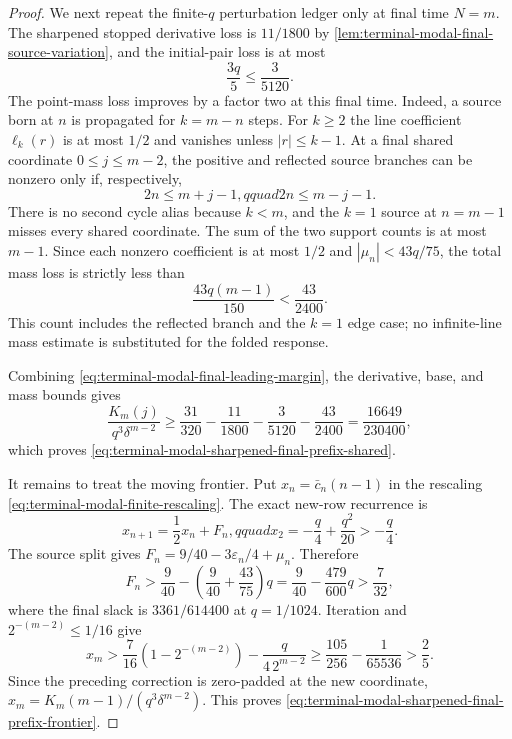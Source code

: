 \begin{proof}
We next repeat the finite-$q$ perturbation ledger only at final time $N=m$.
The sharpened stopped derivative loss is $11/1800$ by
\cref{lem:terminal-modal-final-source-variation}, and the initial-pair loss
is at most
\begin{equation}
 \frac{3q}{5}\le\frac3{5120}.
\end{equation}
The point-mass loss improves by a factor two at this final time.  Indeed, a
source born at $n$ is propagated for $k=m-n$ steps.  For $k\ge2$ the line
coefficient $\ell_k(r)$ is at most $1/2$ and vanishes unless
$|r|\le k-1$.  At a final shared coordinate $0\le j\le m-2$, the positive
and reflected source branches can be nonzero only if, respectively,
\begin{equation}
 2n\le m+j-1,qquad 2n\le m-j-1.
 \label{eq:terminal-modal-final-mass-support}
\end{equation}
There is no second cycle alias because $k<m$, and the $k=1$ source at
$n=m-1$ misses every shared coordinate.  The sum of the two support counts
is at most $m-1$.  Since each nonzero coefficient is at most $1/2$ and
$|\mu_n|<43q/75$, the total mass loss is strictly less than
\begin{equation}
 \frac{43q(m-1)}{150}<\frac{43}{2400}.
 \label{eq:terminal-modal-final-mass-loss}
\end{equation}
This count includes the reflected branch and the $k=1$ edge case; no
infinite-line mass estimate is substituted for the folded response.

Combining \eqref{eq:terminal-modal-final-leading-margin}, the derivative,
base, and mass bounds gives
\begin{equation}
 \frac{K_m(j)}{q^3\delta^{m-2}}
 \ge\frac{31}{320}-\frac{11}{1800}-\frac3{5120}-\frac{43}{2400}
 =\frac{16649}{230400},
\end{equation}
which proves \eqref{eq:terminal-modal-sharpened-final-prefix-shared}.

It remains to treat the moving frontier.  Put
$x_n=\bar c_n(n-1)$ in the rescaling
\eqref{eq:terminal-modal-finite-rescaling}.  The exact new-row recurrence is
\begin{equation}
 x_{n+1}=\frac12x_n+F_n,qquad
 x_2=-\frac q4+\frac{q^2}{20}>-\frac q4.
\end{equation}
The source split gives $F_n=9/40-3\varepsilon_n/4+\mu_n$.  Therefore
\begin{equation}
 F_n>\frac9{40}-\left(\frac9{40}+\frac{43}{75}\right)q
 =\frac9{40}-\frac{479}{600}q>\frac7{32},
\end{equation}
where the final slack is $3361/614400$ at $q=1/1024$.
Iteration and $2^{-(m-2)}\le1/16$ give
\begin{equation}
 x_m>\frac7{16}(1-2^{-(m-2)})
       -\frac{q}{4\,2^{m-2}}
 \ge\frac{105}{256}-\frac1{65536}>\frac25.
\end{equation}
Since the preceding correction is zero-padded at the new coordinate,
$x_m=K_m(m-1)/(q^3\delta^{m-2})$.  This proves
\eqref{eq:terminal-modal-sharpened-final-prefix-frontier}.
\end{proof}

